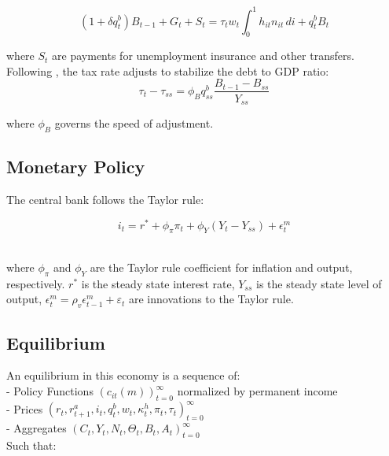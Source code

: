 $$ (1 + \delta q^{b}_{t})B_{t-1} + G_{t}  + S_{t} = \tau_{t} w_{t} \int_{0}^{1} h_{it}n_{it} \, di+ q^{b}_{t}B_{t}$$
\vspace{.2cm}

where $ S_{t}$ are payments for unemployment insurance and other transfers. \\

Following \cite{AuclertMicroJumpsMacroHumps}, the tax rate adjusts to stabilize the debt to GDP ratio:
$$ \tau_{t} - \tau_{ss} = \phi_{B} q^{b}_{ss} \frac{B_{t-1} - B_{ss} }{Y_{ss}}$$
\vspace{.2cm}

where $\phi_{B}$ governs the speed of adjustment. 



\hypertarget{Monetary Policy}{}
\subsection{Monetary Policy}


The central bank follows the Taylor rule: 

$$i_{t} = r^{*} +\phi_{\pi} \pi_{t}  + \phi_{Y} (Y_{t} -  Y_{ss}) + \epsilon^{m}_{t}$$ \

where $\phi_{\pi}$ and $\phi_{Y} $ are the Taylor rule coefficient for inflation and output, respectively.  $r^{*}$ is the steady state interest rate, $Y_{ss}$ is the steady state level of output,  $\epsilon^{m}_{t} = \rho_{v} \epsilon^{m}_{t-1} +\varepsilon_{t}$ are innovations to the Taylor rule. \\

\hypertarget{Equilibrium}{}
\subsection{Equilibrium}


An equilibrium in this economy is a sequence of: \\

- Policy Functions $\left( c_{it}(m) \right )_{t=0}^{\infty}$ normalized by permanent income \\

- Prices $ \left(r_{t},  r^{a}_{t+1}, i_{t}, q^{b}_{t},  w_{t}, \kappa^{h}_{t} , \pi_{t} , \tau_{t} \right) _{t=0}^{\infty}$\\

- Aggregates $ \left(C_{t}, Y_{t} , N_{t},   \Theta_{t},  B_{t} , A_{t}  \right)_{t=0}^{\infty}$\\

Such that: \\


